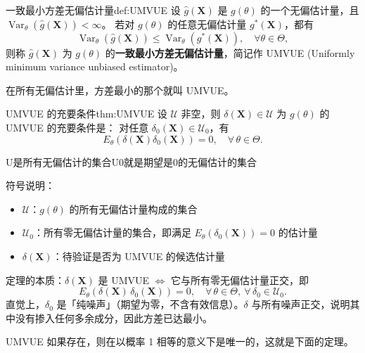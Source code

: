\begin{definition}{一致最小方差无偏估计量}{def:UMVUE}
设 $\hat{g}(\boldsymbol{X})$ 是 $g(\theta)$ 的一个无偏估计量，且 $\operatorname{Var}_{\theta}(\hat{g}(\boldsymbol{X})) < \infty$。
若对 $g(\theta)$ 的任意无偏估计量 $g^*(\boldsymbol{X})$，都有
\[
\operatorname{Var}_{\theta}(\hat{g}(\boldsymbol{X})) \leq \operatorname{Var}_{\theta}(g^*(\boldsymbol{X})), \quad \forall \theta \in \Theta,
\]
则称 $\hat{g}(\boldsymbol{X})$ 为 $g(\theta)$ 的\textbf{一致最小方差无偏估计量}，简记作 UMVUE
(Uniformly minimum variance unbiased estimator)。
\end{definition}
在所有无偏估计里，方差最小的那个就叫 UMVUE。
\begin{theorem}{UMVUE 的充要条件}{thm:UMVUE}
设 $\mathcal{U}$ 非空，则 $\delta(\boldsymbol{X}) \in \mathcal{U}$ 为 $g(\theta)$ 的 UMVUE 的充要条件是：
对任意 $\delta_0(\boldsymbol{X}) \in \mathcal{U}_0$，有
\[
E_{\theta}(\delta(\boldsymbol{X})\delta_0(\boldsymbol{X})) = 0, \quad \forall\, \theta \in \Theta.
\]
\end{theorem}
\begin{dxtips}
    U是所有无偏估计的集合U0就是期望是0的无偏估计的集合
\end{dxtips}
\begin{note}
符号说明：
\begin{itemize}
  \item $\mathcal{U}$：$g(\theta)$ 的所有无偏估计量构成的集合
  \item $\mathcal{U}_0$：所有零无偏估计量的集合，即满足 $E_\theta(\delta_0(\boldsymbol{X})) = 0$ 的估计量
  \item $\delta(\boldsymbol{X})$：待验证是否为 UMVUE 的候选估计量
\end{itemize}
定理的本质：$\delta(\boldsymbol{X})$ 是 UMVUE $\iff$ 它与所有零无偏估计量正交，即
\[
  E_\theta(\delta(\boldsymbol{X})\,\delta_0(\boldsymbol{X})) = 0, \quad \forall\,\theta \in \Theta,\ \forall\,\delta_0 \in \mathcal{U}_0.
\]
直觉上，$\delta_0$ 是「纯噪声」（期望为零，不含有效信息）。$\delta$ 与所有噪声正交，说明其中没有掺入任何多余成分，因此方差已达最小。
\end{note}
UMVUE 如果存在，则在以概率 1 相等的意义下是唯一的，这就是下面的定理。

